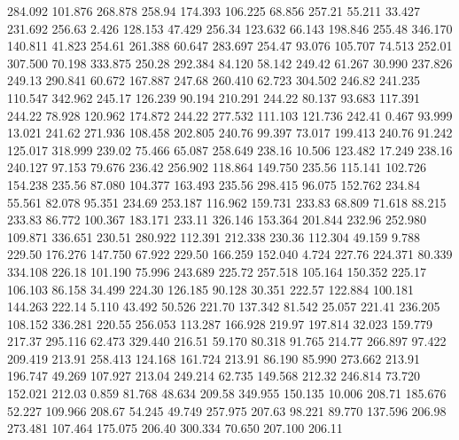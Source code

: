  284.092  101.876  268.878       258.94
 174.393  106.225   68.856       257.21
  55.211   33.427  231.692       256.63
   2.426  128.153   47.429       256.34
 123.632   66.143  198.846       255.48
 346.170  140.811   41.823       254.61
 261.388   60.647  283.697       254.47
  93.076  105.707   74.513       252.01
 307.500   70.198  333.875       250.28
 292.384   84.120   58.142       249.42
  61.267   30.990  237.826       249.13
 290.841   60.672  167.887       247.68
 260.410   62.723  304.502       246.82
 241.235  110.547  342.962       245.17
 126.239   90.194  210.291       244.22
  80.137   93.683  117.391       244.22
  78.928  120.962  174.872       244.22
 277.532  111.103  121.736       242.41
   0.467   93.999   13.021       241.62
 271.936  108.458  202.805       240.76
  99.397   73.017  199.413       240.76
  91.242  125.017  318.999       239.02
  75.466   65.087  258.649       238.16
  10.506  123.482   17.249       238.16
 240.127   97.153   79.676       236.42
 256.902  118.864  149.750       235.56
 115.141  102.726  154.238       235.56
  87.080  104.377  163.493       235.56
 298.415   96.075  152.762       234.84
  55.561   82.078   95.351       234.69
 253.187  116.962  159.731       233.83
  68.809   71.618   88.215       233.83
  86.772  100.367  183.171       233.11
 326.146  153.364  201.844       232.96
 252.980  109.871  336.651       230.51
 280.922  112.391  212.338       230.36
 112.304   49.159    9.788       229.50
 176.276  147.750   67.922       229.50
 166.259  152.040    4.724       227.76
 224.371   80.339  334.108       226.18
 101.190   75.996  243.689       225.72
 257.518  105.164  150.352       225.17
 106.103   86.158   34.499       224.30
 126.185   90.128   30.351       222.57
 122.884  100.181  144.263       222.14
   5.110   43.492   50.526       221.70
 137.342   81.542   25.057       221.41
 236.205  108.152  336.281       220.55
 256.053  113.287  166.928       219.97
 197.814   32.023  159.779       217.37
 295.116   62.473  329.440       216.51
  59.170   80.318   91.765       214.77
 266.897   97.422  209.419       213.91
 258.413  124.168  161.724       213.91
  86.190   85.990  273.662       213.91
 196.747   49.269  107.927       213.04
 249.214   62.735  149.568       212.32
 246.814   73.720  152.021       212.03
   0.859   81.768   48.634       209.58
 349.955  150.135   10.006       208.71
 185.676   52.227  109.966       208.67
  54.245   49.749  257.975       207.63
  98.221   89.770  137.596       206.98
 273.481  107.464  175.075       206.40
 300.334   70.650  207.100       206.11
